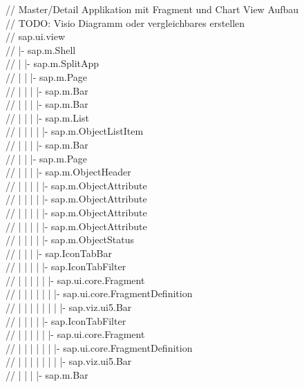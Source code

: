 \documentclass[12pt,a4paper,bibliography=totocnumbered,listof=totocnumbered]{scrartcl}
\begin{document}
// Master/Detail Applikation mit Fragment und Chart View Aufbau\\
// TODO: Visio Diagramm oder vergleichbares erstellen\\
// sap.ui.view\\
//   |- sap.m.Shell\\
//   |  |- sap.m.SplitApp\\
//   |  |  |- sap.m.Page\\
//   |  |  |  |- sap.m.Bar\\
//   |  |  |  |- sap.m.Bar\\
//   |  |  |  |- sap.m.List\\
//   |  |  |  |  |- sap.m.ObjectListItem\\
//   |  |  |  |- sap.m.Bar\\
//   |  |  |- sap.m.Page\\
//   |  |  |  |- sap.m.ObjectHeader\\
//   |  |  |  |  |- sap.m.ObjectAttribute\\
//   |  |  |  |  |- sap.m.ObjectAttribute\\
//   |  |  |  |  |- sap.m.ObjectAttribute\\
//   |  |  |  |  |- sap.m.ObjectAttribute\\
//   |  |  |  |  |- sap.m.ObjectStatus\\
//   |  |  |  |- sap.IconTabBar\\
//   |  |  |  |  |- sap.IconTabFilter\\
//   |  |  |  |  |  |- sap.ui.core.Fragment\\
//   |  |  |  |  |  |  |- sap.ui.core.FragmentDefinition\\
//   |  |  |  |  |  |  |  |- sap.viz.ui5.Bar\\
//   |  |  |  |  |- sap.IconTabFilter\\
//   |  |  |  |  |  |- sap.ui.core.Fragment\\
//   |  |  |  |  |  |  |- sap.ui.core.FragmentDefinition\\
//   |  |  |  |  |  |  |  |- sap.viz.ui5.Bar\\
//   |  |  |  |- sap.m.Bar\\
\end{document}
